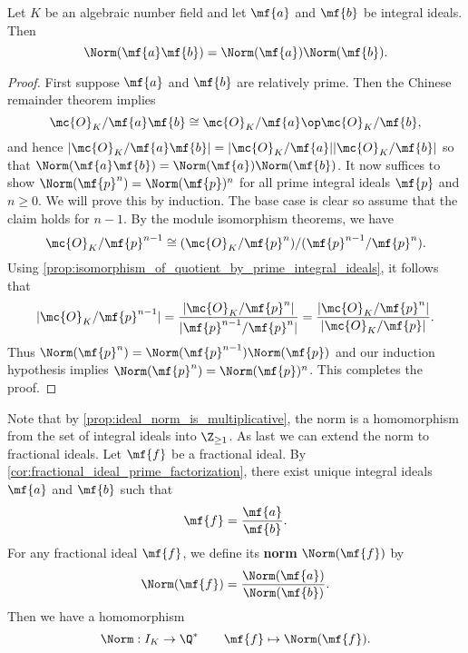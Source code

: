     \begin{proposition}\label{prop:ideal_norm_is_multiplicative}
      Let $K$ be an algebraic number field and let $\mf{a}$ and $\mf{b}$ be integral ideals. Then
      \[
        \Norm(\mf{a}\mf{b}) = \Norm(\mf{a})\Norm(\mf{b}).
      \]
    \end{proposition}
    \begin{proof}
      First suppose $\mf{a}$ and $\mf{b}$ are relatively prime. Then the Chinese remainder theorem implies
      \[
        \mc{O}_{K}/\mf{a}\mf{b} \cong \mc{O}_{K}/\mf{a} \op \mc{O}_{K}/\mf{b},
      \]
      and hence $|\mc{O}_{K}/\mf{a}\mf{b}| = |\mc{O}_{K}/\mf{a}||\mc{O}_{K}/\mf{b}|$ so that $\Norm(\mf{a}\mf{b}) = \Norm(\mf{a})\Norm(\mf{b})$. It now suffices to show $\Norm(\mf{p}^{n}) = \Norm(\mf{p})^{n}$ for all prime integral ideals $\mf{p}$ and $n \ge 0$. We will prove this by induction. The base case is clear so assume that the claim holds for $n-1$. By the module isomorphism theorems, we have
      \[
        \mc{O}_{K}/\mf{p}^{n-1} \cong (\mc{O}_{K}/\mf{p}^{n})/(\mf{p}^{n-1}/\mf{p}^{n}).
      \]
      Using \cref{prop:isomorphism_of_quotient_by_prime_integral_ideals}, it follows that
      \[
        |\mc{O}_{K}/\mf{p}^{n-1}| = \frac{|\mc{O}_{K}/\mf{p}^{n}|}{|\mf{p}^{n-1}/\mf{p}^{n}|} = \frac{|\mc{O}_{K}/\mf{p}^{n}|}{|\mc{O}_{K}/\mf{p}|}.
      \]
      Thus $\Norm(\mf{p}^{n}) = \Norm(\mf{p}^{n-1})\Norm(\mf{p})$ and our induction hypothesis implies $\Norm(\mf{p}^{n}) = \Norm(\mf{p})^{n}$. This completes the proof.
    \end{proof}

    Note that by \cref{prop:ideal_norm_is_multiplicative}, the norm is a homomorphism from the set of integral ideals into $\Z_{\ge 1}$. As last we can extend the norm to fractional ideals. Let $\mf{f}$ be a fractional ideal. By \cref{cor:fractional_ideal_prime_factorization}, there exist unique integral ideals $\mf{a}$ and $\mf{b}$ such that
    \[
      \mf{f} = \frac{\mf{a}}{\mf{b}}.
    \]
    For any fractional ideal $\mf{f}$, we define its \textbf{norm} $\Norm(\mf{f})$ by
    \[
      \Norm(\mf{f}) = \frac{\Norm(\mf{a})}{\Norm(\mf{b})}.
    \]
    Then we have a homomorphism
    \[
      \Norm:I_{K} \to \Q^{\ast} \qquad \mf{f} \mapsto \Norm(\mf{f}).
    \]

